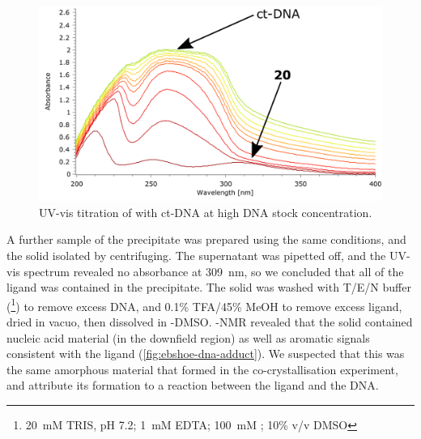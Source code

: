 \begin{refsection}
\begin{figure}
    \includegraphics[width=0.7\linewidth]{Figures/ebshoe-ctdna-hiconc.pdf}
    \caption{UV-vis titration of  with ct-DNA at high DNA stock concentration.}\label{fig:ebshoe-ctdna-hiconc}
\end{figure}

A further sample of the precipitate was prepared using the same conditions, and the solid isolated by centrifuging.
The supernatant was pipetted off, and the UV-vis spectrum revealed no absorbance at 309~nm, so we concluded that all of the ligand was contained in the precipitate.
The solid was washed with T/E/N buffer (\footnote{20~mM TRIS, pH 7.2; 1~mM EDTA; 100~mM ; 10\% v/v DMSO}) to remove excess DNA, and 0.1\% TFA/45\% MeOH to remove excess ligand, dried in vacuo, then dissolved in -DMSO.\@
{}-NMR revealed that the solid contained nucleic acid material (in the downfield region) as well as aromatic signals consistent with the ligand (\cref{fig:ebshoe-dna-adduct}).
We suspected that this was the same amorphous material that formed in the co-crystallisation experiment, and attribute its formation to a reaction between the ligand and the DNA.\@


\end{refsection}
